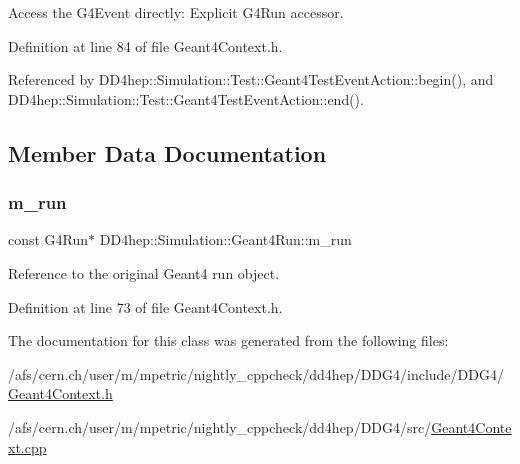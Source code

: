 Access the G4\+Event directly\+: Explicit G4\+Run accessor. 



Definition at line 84 of file Geant4\+Context.\+h.



Referenced by D\+D4hep\+::\+Simulation\+::\+Test\+::\+Geant4\+Test\+Event\+Action\+::begin(), and D\+D4hep\+::\+Simulation\+::\+Test\+::\+Geant4\+Test\+Event\+Action\+::end().



\subsection{Member Data Documentation}
\hypertarget{class_d_d4hep_1_1_simulation_1_1_geant4_run_a9749412423798b1b248adc8c85acbcc1}{}\label{class_d_d4hep_1_1_simulation_1_1_geant4_run_a9749412423798b1b248adc8c85acbcc1} 
\subsubsection{\texorpdfstring{m\+\_\+run}{m\_run}}
{\footnotesize\ttfamily const G4\+Run$\ast$ D\+D4hep\+::\+Simulation\+::\+Geant4\+Run\+::m\+\_\+run\hspace{0.3cm}{\ttfamily [private]}}



Reference to the original Geant4 run object. 



Definition at line 73 of file Geant4\+Context.\+h.



The documentation for this class was generated from the following files\+:\begin{DoxyCompactItemize}
\item 
/afs/cern.\+ch/user/m/mpetric/nightly\+\_\+cppcheck/dd4hep/\+D\+D\+G4/include/\+D\+D\+G4/\hyperlink{_geant4_context_8h}{Geant4\+Context.\+h}\item 
/afs/cern.\+ch/user/m/mpetric/nightly\+\_\+cppcheck/dd4hep/\+D\+D\+G4/src/\hyperlink{_geant4_context_8cpp}{Geant4\+Context.\+cpp}\end{DoxyCompactItemize}
